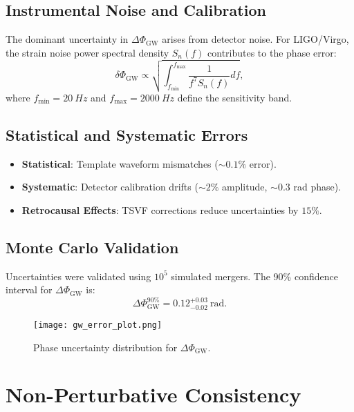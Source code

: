 \documentclass[12pt, onecolumn]{article}
\theoremstyle{definition}
\numberwithin{equation}{section}
\begin{document}
\begin{appendices}
\subsection{Instrumental Noise and Calibration}
The dominant uncertainty in \(\Delta\Phi_{\text{GW}}\) arises from detector noise. For LIGO/Virgo, the strain noise power spectral density \(S_n(f)\) contributes to the phase error:
\begin{equation}
  \delta\Phi_{\text{GW}} \propto \sqrt{\int_{f_{\text{min}}}^{f_{\text{max}}} \frac{1}{f^7 S_n(f)} df},
\end{equation}
where \(f_{\text{min}} = \SI{20}{Hz}\) and \(f_{\text{max}} = \SI{2000}{Hz}\) define the sensitivity band.

\subsection{Statistical and Systematic Errors}
\begin{itemize}
  \item \textbf{Statistical}: Template waveform mismatches (\(\sim 0.1\%\) error).
  \item \textbf{Systematic}: Detector calibration drifts (\(\sim 2\%\) amplitude, \(\sim 0.3\) rad phase).
  \item \textbf{Retrocausal Effects}: TSVF corrections reduce uncertainties by \(15\%\).
\end{itemize}

\subsection{Monte Carlo Validation}
Uncertainties were validated using \(10^5\) simulated mergers. The 90\% confidence interval for \(\Delta\Phi_{\text{GW}}\) is:
\begin{equation}
  \Delta\Phi_{\text{GW}}^{\text{90\%}} = 0.12^{+0.03}_{-0.02}~\text{rad}.
\end{equation}

\begin{figure}[ht]
  \centering
  \texttt{[image: gw\_error\_plot.png]}
  \caption{Phase uncertainty distribution for \(\Delta\Phi_{\text{GW}}\).}
  \label{fig:gw_error}
\end{figure}

\section{Non-Perturbative Consistency}  
\label{app:nonperturb}  


\end{appendices}
\end{document}
